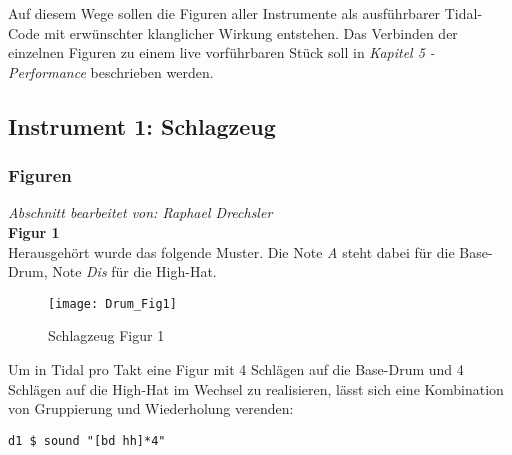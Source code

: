 \documentclass[
10pt, %
a4paper, %
oneside, %
headinclude,footinclude, %
BCOR5mm, %
]{scrartcl}
\begin{document}
\noindent Auf diesem Wege sollen die Figuren aller Instrumente als ausführbarer Tidal-Code mit erwünschter klanglicher Wirkung entstehen.
Das Verbinden der einzelnen Figuren zu einem live vorführbaren Stück soll in \textit{Kapitel 5 - Performance} beschrieben werden. 


%
%
%

\subsection{Instrument 1: Schlagzeug}
\subsubsection{Figuren}
\textit{Abschnitt bearbeitet von: Raphael Drechsler}\\

\noindent \textbf{Figur 1}\\
Herausgehört wurde das folgende Muster. Die Note \textit{A} steht dabei für die Base-Drum, Note \textit{Dis} für die High-Hat.
\begin{figure}[h]
	\centering 
	\texttt{[image: Drum\_Fig1]} 
	\caption{Schlagzeug Figur 1}
\end{figure}

\noindent Um in Tidal pro Takt eine Figur mit 4 Schlägen auf die Base-Drum und 4 Schlägen auf die High-Hat im Wechsel zu realisieren, lässt sich eine Kombination von Gruppierung und Wiederholung\cite{tid1} verenden:
\begin{lstlisting}
d1 $ sound "[bd hh]*4"
\end{lstlisting}
\end{document}
